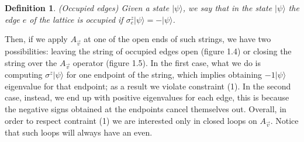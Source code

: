 \documentclass{Configuration_Files/PoliMi3i_thesis}
\newtheorem{definition}{Definition}[chapter]
\begin{document}
\begin{definition}(Occupied edges)
	Given a state $|\psi\rangle $, we say that in the state $|\psi\rangle $ the edge $e$ of the lattice is occupied if $\sigma^z_e |\psi\rangle  = - |\psi\rangle $.
\end{definition}

Then, if we apply $A_{\vec{v}} $ at one of the open ends of such strings, we have two possibilities: leaving the string of occupied edges open (figure 1.4) or closing the string over the $A_{\vec{v}} $ operator (figure 1.5).
In the first case, what we do is computing $\sigma^{z} |\psi\rangle$ for one endpoint of the string, which implies obtaining $-1|\psi\rangle$ eigenvalue for that endpoint; as a result we violate constraint (1). In the second case, instead, we end up with positive eigenvalues for each edge, this is because the negative signs obtained at the endpoints cancel themselves out. Overall, in order to respect contraint (1) we are interested only in closed loops on $A_{\vec{v}} $. Notice that such loops will always have an even.{\cite{Her20}}
\end{document}

